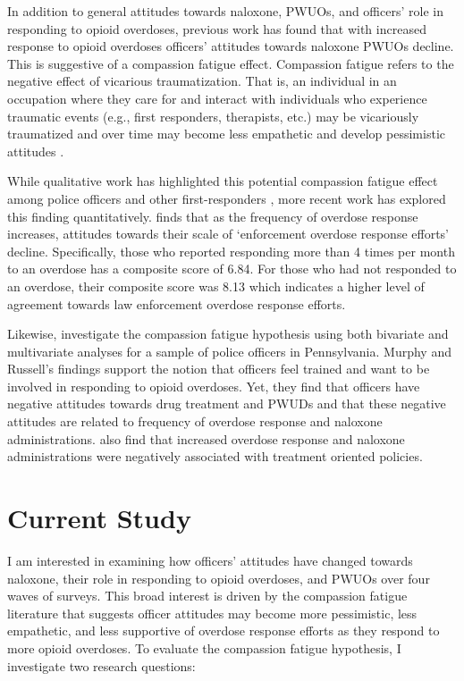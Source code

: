 In addition to general attitudes towards naloxone, PWUOs, and officers’ role in responding to opioid overdoses, previous work has found that with increased response to opioid overdoses officers’ attitudes towards naloxone PWUOs decline. This is suggestive of a compassion fatigue effect. Compassion fatigue refers to the negative effect of vicarious traumatization. That is, an individual in an occupation where they care for and interact with individuals who experience traumatic events (e.g., first responders, therapists, etc.) may be vicariously traumatized and over time may become less empathetic and develop pessimistic attitudes \parencite{adams_compassion_2006, figley_compassion_1995}. 

While qualitative work has highlighted this potential compassion fatigue effect among police officers and other first-responders \parencite{banta-green_police_2013, saunders_you_2019}, more recent work has explored this finding quantitatively. \textcite{carroll_knowledge_2020} finds that as the frequency of overdose response increases, attitudes towards their scale of ‘enforcement overdose response efforts’ decline. Specifically, those who reported responding more than 4 times per month to an overdose has a composite score of 6.84. For those who had not responded to an overdose, their composite score was 8.13 which indicates a higher level of agreement towards law enforcement overdose response efforts. 

Likewise, \textcite{murphy_police_2020} investigate the compassion fatigue hypothesis using both bivariate and multivariate analyses for a sample of police officers in Pennsylvania. Murphy and Russell’s findings support the notion that officers feel trained and want to be involved in responding to opioid overdoses. Yet, they find that officers have negative attitudes towards drug treatment and PWUDs and that these negative attitudes are related to frequency of overdose response and naloxone administrations. \textcite{murphy_police_2021} also find that increased overdose response and naloxone administrations were negatively associated with treatment oriented policies.

\section{Current Study}

I am interested in examining how officers’ attitudes have changed towards naloxone, their role in responding to opioid overdoses, and PWUOs over four waves of surveys. This broad interest is driven by the compassion fatigue literature that suggests officer attitudes may become more pessimistic, less empathetic, and less supportive of overdose response efforts as they respond to more opioid overdoses. To evaluate the compassion fatigue hypothesis, I investigate two research questions:

